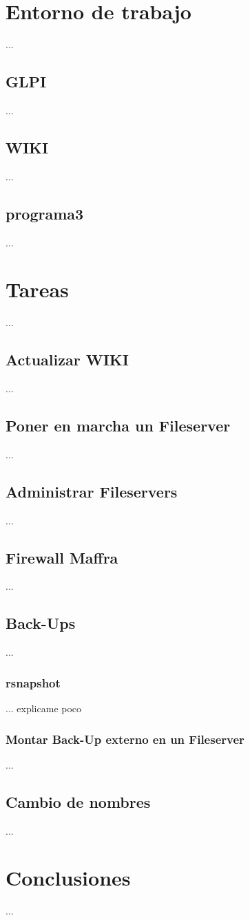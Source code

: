 \documentclass[12pt,a4paper]{article}
\begin{document}
\section{Entorno de trabajo}
...
\subsection{GLPI}
...
\subsection{WIKI}
...
\subsection{programa3}
...
\section{Tareas}
...
\subsection{Actualizar WIKI}
...
\subsection{Poner en marcha un Fileserver}
...
\subsection{Administrar Fileservers}
...
\subsection{Firewall Maffra}
...
\subsection{Back-Ups}
...
\subsubsection{rsnapshot}
... explicame poco
\subsubsection{Montar Back-Up externo en un Fileserver}
...
\subsection{Cambio de nombres}
...
\section{Conclusiones}
...
\end{document}
